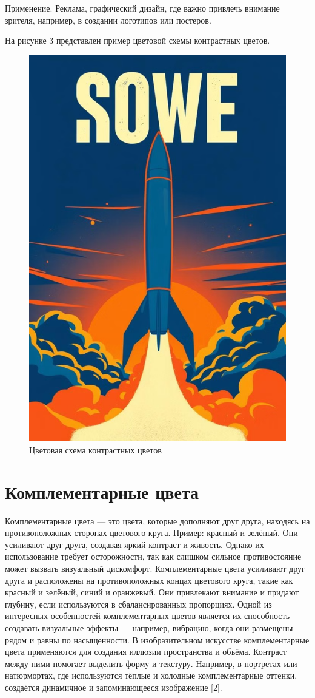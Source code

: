 \documentclass[bachelor, och, referat]{SCWorks}
\begin{document}
Применение. Реклама, графический дизайн, где важно привлечь внимание зрителя, например, в создании логотипов или постеров.

На рисунке 3 представлен пример цветовой схемы контрастных цветов.
\begin{figure}
        \includegraphics[width=0.6\linewidth]{contrast_example.png} 
        \caption{Цветовая схема контрастных цветов}
 \end{figure}

\section{Комплементарные цвета}
Комплементарные цвета — это цвета, которые дополняют друг друга, находясь на противоположных сторонах цветового круга. Пример: красный и зелёный. Они усиливают друг друга, создавая яркий контраст и живость. Однако их использование требует осторожности, так как слишком сильное противостояние может вызвать визуальный дискомфорт.
Комплементарные цвета усиливают друг друга и расположены на противоположных концах цветового круга, такие как красный и зелёный, синий и оранжевый. Они привлекают внимание и придают глубину, если используются в сбалансированных пропорциях. Одной из интересных особенностей комплементарных цветов является их способность создавать визуальные эффекты — например, вибрацию, когда они размещены рядом и равны по насыщенности.
В изобразительном искусстве комплементарные цвета применяются для создания иллюзии пространства и объёма. Контраст между ними помогает выделить форму и текстуру. Например, в портретах или натюрмортах, где используются тёплые и холодные комплементарные оттенки, создаётся динамичное и запоминающееся изображение [2].
\end{document}
